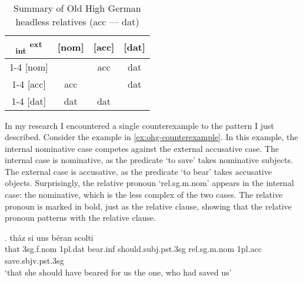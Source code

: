 \begin{table}[H]
  \center
  \caption{Summary of Old High German headless relatives (\ac{acc} --- \ac{dat})}
  \begin{tabular}{c|c|c|c}
    \toprule
        \textsubscript{\ac{int}} \textsuperscript{\ac{ext}}
          & [\ac{nom}]
          & [\ac{acc}]
          & [\ac{dat}]
          \\ \cmidrule{1-4}
      [\ac{nom}]
          & \xcancel{\phantom{xx}}
          & \ac{acc}
          & \ac{dat}
          \\ \cmidrule{1-4}
      [\ac{acc}]
          & \ac{acc}
          & \xcancel{\phantom{xx}}
          & \cellcolor{LG}\ac{dat}
          \\ \cmidrule{1-4}
      [\ac{dat}]
          & \ac{dat}
          & \cellcolor{DG}\ac{dat}
          & \xcancel{\phantom{xx}}
          \\
    \bottomrule
  \end{tabular}
    \label{tbl:summary-old-high-german-acc-dat}
\end{table}

In my research I encountered a single counterexample to the pattern I just described.
Consider the example in \ref{ex:ohg-counterexample}. In this example, the internal nominative case competes against the external accusative case.
The internal case is nominative, as the predicate  `to save' takes nominative subjects.
The external case is accusative, as the predicate  `to bear' takes accusative objects.
Surprisingly, the relative pronoun  `\ac{rel}.\ac{sg}.\ac{m}.\ac{nom}' appears in the internal case: the nominative, which is the less complex of the two cases. The relative pronoun is marked in bold, just as the relative clause, showing that the relative pronoun patterns with the relative clause.

\exg. tház si uns béran scolti   \\
 that 3\ac{sg}.\ac{f}.\ac{nom} 1\ac{pl}.\ac{dat} bear.\ac{inf}\scsub{[acc]} should.\ac{subj}.\ac{pst}.3\ac{sg} \ac{rel}.\ac{sg}.\ac{m}.\ac{nom} 1\ac{pl}.\ac{acc} save.\ac{sbjv}.\ac{pst}.3\ac{sg}\scsub{[nom]}\\
 `that she should have beared for us the one, who had saved us' \label{ex:ohg-counterexample}

